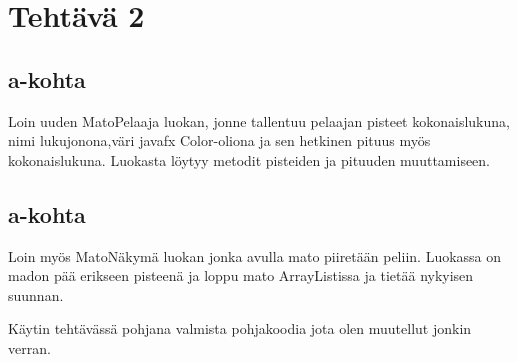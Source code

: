 
\chapter{Tehtävä 2 \label{chap:Teht=0000E4v=0000E4-2}}

\section{a-kohta}
\label{a-kohta}
Loin uuden MatoPelaaja luokan, jonne tallentuu pelaajan pisteet kokonaislukuna, nimi lukujonona,väri javafx Color-oliona ja sen hetkinen pituus myös kokonaislukuna. Luokasta löytyy metodit pisteiden ja pituuden muuttamiseen.
\section{a-kohta}
\label{a-kohta}
Loin myös MatoNäkymä luokan jonka avulla mato piiretään peliin. Luokassa on madon
pää erikseen pisteenä ja loppu mato ArrayListissa ja tietää nykyisen suunnan.

Käytin tehtävässä pohjana valmista pohjakoodia jota olen muutellut jonkin verran.

